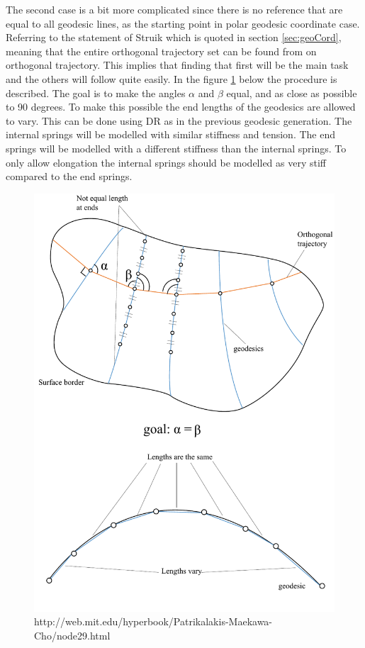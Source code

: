 The second case is a bit more complicated since there is no reference that are equal to all geodesic lines, as the starting point in polar geodesic coordinate case. Referring to the statement of Struik which is quoted in section \ref{sec:geoCord}, meaning that the entire orthogonal trajectory set can be found from on orthogonal trajectory. This implies that finding that first will be the main task and the others will follow quite easily. In the figure \ref{fig:geoAlg} below the procedure is described. The goal is to make the angles $\alpha$ and $\beta$ equal, and as close as possible to 90 degrees. To make this possible the end lengths of the geodesics are allowed to vary. This can be done using DR as in the previous geodesic generation. The internal springs will be modelled with similar stiffness and tension. The end springs will be modelled with a different stiffness than the internal springs. To only allow elongation the internal springs should be modelled as very stiff compared to the end springs.


\begin{figure}[H]
\centering
\includegraphics[width = 0.8\linewidth ]{figure/Method/GeodesicCoord.pdf}
\caption{http://web.mit.edu/hyperbook/Patrikalakis-Maekawa-Cho/node29.html}
\label{fig:geoAlg}
\end{figure}


